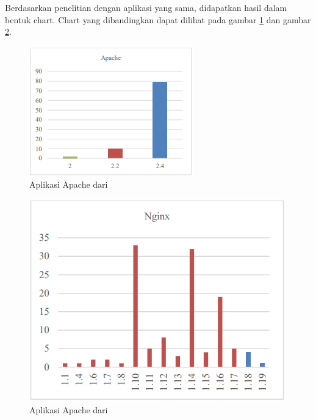 Berdasarkan penelitian dengan aplikasi yang sama, didapatkan hasil dalam bentuk chart. Chart yang dibandingkan dapat dilihat pada gambar \ref{fig:data_sample_apache_p} dan gambar \ref{fig:data_sample_nginx_p}.
\begin{figure}[H]
	\centering  
	\includegraphics[scale=0.7]{Gambar/chart_pascal_apache.PNG}  
	\caption{Aplikasi Apache dari \cite{pascal}} 
	\label{fig:data_sample_apache_p} 
\end{figure}
\begin{figure}[H]
	\centering  
	\includegraphics[scale=0.7]{Gambar/chart_pascal_nginx.PNG}  
	\caption{Aplikasi Apache dari \cite{pascal}} 
	\label{fig:data_sample_nginx_p} 
\end{figure}

